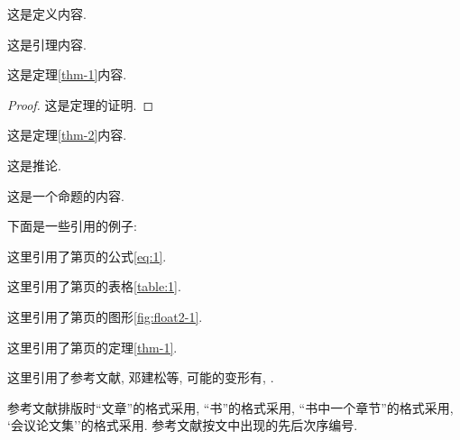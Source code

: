 \documentclass[a4paper,c5size,onecolumn,twoside,cap,Chinese]{APSart}
\begin{document}
\begin{definition}
这是定义内容.
\end{definition}

\begin{lemma}
这是引理内容.
\end{lemma}

\begin{theorem}\label{thm-1}
这是定理\ref{thm-1}内容.
\end{theorem}

\begin{proof}
这是定理的证明.
\end{proof}

\begin{theorem}[唯一性定理]\label{thm-2}
这是定理\ref{thm-2}内容.
\end{theorem}

\begin{corollary}
这是推论.
\end{corollary}

\begin{proposition}
这是一个命题的内容.
\end{proposition}

下面是一些引用的例子:

\begin{example}
这里引用了第\pageref{eq:1}页的公式\eqref{eq:1}.
\end{example}

\begin{example}
这里引用了第\pageref{table:1}页的表格\ref{table:1}.
\end{example}

\begin{example}
这里引用了第\pageref{fig:float2-1}页的图形\ref{fig:float2-1}.
\end{example}

\begin{example}
这里引用了第\pageref{thm-1}页的定理\ref{thm-1}.
\end{example}

\begin{example}
这里引用了参考文献, 邓建松等,
可能的变形有, .
\end{example}

\begin{example}
参考文献排版时``文章''的格式采用, ``书''的格式采用, 
``书中一个章节''的格式采用, `会议论文集''的格式采用. 
参考文献按文中出现的先后次序编号.
\end{example}
\end{document}
